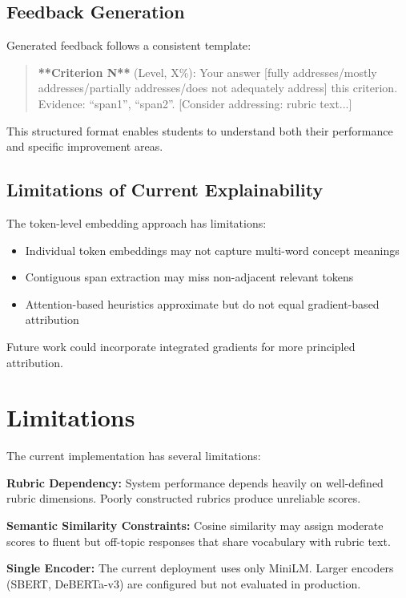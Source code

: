 \documentclass[conference]{IEEEtran}
\begin{document}
\subsection{Feedback Generation}
Generated feedback follows a consistent template:
\begin{quote}
\textbf{**Criterion N**} (Level, X\%): Your answer [fully addresses/mostly addresses/partially addresses/does not adequately address] this criterion. Evidence: ``span1'', ``span2''. [Consider addressing: rubric text...]
\end{quote}

This structured format enables students to understand both their performance and specific improvement areas.

\subsection{Limitations of Current Explainability}
The token-level embedding approach has limitations:
\begin{itemize}
    \item Individual token embeddings may not capture multi-word concept meanings
    \item Contiguous span extraction may miss non-adjacent relevant tokens
    \item Attention-based heuristics approximate but do not equal gradient-based attribution
\end{itemize}

Future work could incorporate integrated gradients for more principled attribution.

\section{Limitations}
The current implementation has several limitations:

\textbf{Rubric Dependency:} System performance depends heavily on well-defined rubric dimensions. Poorly constructed rubrics produce unreliable scores.

\textbf{Semantic Similarity Constraints:} Cosine similarity may assign moderate scores to fluent but off-topic responses that share vocabulary with rubric text.

\textbf{Single Encoder:} The current deployment uses only MiniLM. Larger encoders (SBERT, DeBERTa-v3) are configured but not evaluated in production.
\end{document}
